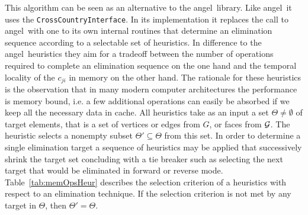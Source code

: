 \documentclass{book}
\newcommand{\angel}{angel}
\newcommand{\reftab}[1]{{Table~\ref{#1}}}
\begin{document}
This algorithm can be seen as an alternative to the \angel\ library. 
Like \angel\ it uses the \lstinline{CrossCountryInterface}. In its implementation 
it replaces the call to \angel\ with one to its own internal routines that
determine an elimination sequence according to a selectable set of heuristics. 
In difference to the \angel\ heuristics  they 
aim for a tradeoff between the number of operations required to complete an elimination 
sequence on the one hand and the temporal locality of the $c_{ji}$ in memory on the other hand. 
The rationale for these heuristics is the observation that in many modern 
computer architectures the performance is memory bound, i.e. a few additional 
operations can easily be absorbed if we keep all the necessary data in cache. 
All heuristics take as an input a set $\Theta \neq \emptyset $ of target elements, that is 
a set of vertices or edges from $G$, or faces from $\cal G$. 
The heuristic selects a nonempty subset $\Theta'\subseteq \Theta $ from this set. 
In order to determine a single elimination target a sequence of heuristics may be applied 
that successively shrink the target set concluding with a tie breaker such as 
selecting the next target that would be eliminated in forward or reverse mode. 
\reftab{tab:memOpsHeur} describes the selection criterion of a heuristics with 
respect to an elimination technique.  If the selection criterion is not met 
by any target in $\Theta$, then $\Theta'=\Theta$. 
\end{document}
